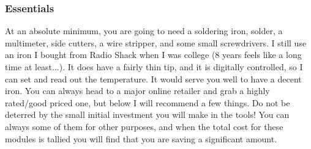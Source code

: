 \documentclass{article}
\begin{document}
\subsubsection{Essentials}
At an absolute minimum, you are going to need a soldering iron, solder, a multimeter, side cutters, a wire stripper, and some small screwdrivers. I still use an iron I bought from Radio Shack when I was college (8 years feels like a long time at least...). It does have a fairly thin tip, and it is digitally controlled, so I can set and read out the temperature. It would serve you well to have a decent iron. You can always head to a major online retailer and grab a highly rated/good priced one, but below I will recommend a few things. Do not be deterred by the small initial investment you will make in the tools! You can always some of them for other purposes, and when the total cost for these modules is tallied you will find that you are saving a significant amount.
\end{document}
